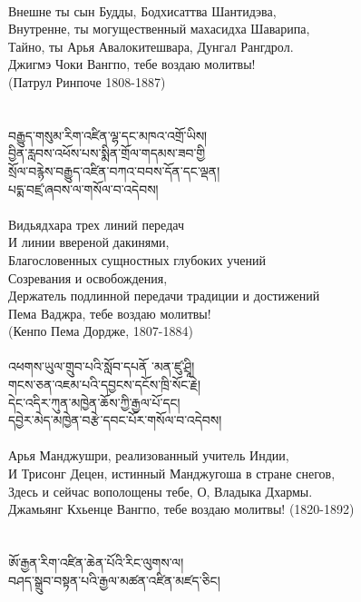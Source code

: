 \\
\ru
Внешне ты сын Будды, Бодхисаттва Шантидэва,\\
Внутренне, ты могущественный махасидха Шаварипа,\\
Тайно, ты Арья Авалокитешвара, Дунгал Рангдрол.\\
Джигмэ Чоки Вангпо, тебе воздаю молитвы!\\
\hspace{1cm} (Патрул Ринпоче 1808-1887)\\
\\
\\
\ti
བརྒྱུད་གསུམ་རིག་འཛིན་ལྷ་དང་མཁའ་འགྲོ་ཡིས། \\
བྱིན་རླབས་འཕོས་པས་སྨིན་གྲོལ་གདམས་ཟབ་གྱི \\
སྲོལ་བརྙེས་བརྒྱུད་འཛིན་བཀའ་བབས་དོན་དང་ལྡན། \\
པདྨ་བཛྲ་ཞབས་ལ་གསོལ་བ་འདེབས།\\
\\
\ru
Видьядхара трех линий передач\\ И линии ввереной дакинями,\\
Благословенных сущностных глубоких учений \\Созревания и освобождения,\\
Держатель подлинной передачи традиции и достижений\\
Пема Ваджра, тебе воздаю молитвы! \\ \hspace{1cm} (Кенпо Пема Дордже, 1807-1884)\\
\\
\newpage
\ti
འཕགས་ཡུལ་གྲུབ་པའི་སློབ་དཔནོ ་མན་ཛུ་ཤྲཱི། \\
གངས་ཅན་འཇམ་པའི་དབྱངས་དངོས་ཁྲི་སོང་རྗེ། \\
དེང་འདིར་ཀུན་མཁྱེན་ཆོས་ཀྱི་རྒྱལ་པོ་དང། \\
དབྱེར་མེད་མཁྱེན་བརྩེ་དབང་པོར་གསོལ་བ་འདེབས།\\
\\
\ru
Арья Манджушри, реализованный учитель Индии,\\
И Трисонг Децен, истинный Манджугоша в стране снегов,\\
Здесь и сейчас вополощены тебе, О, Владыка Дхармы. \\
Джамьянг Кхьенце Вангпо, тебе воздаю молитвы! (1820-1892)\\
\\
\\
\ti
ཨོ་རྒྱན་རིག་འཛིན་ཆེན་པོའི་རིང་ལུགས་ལ། \\
བཤད་སྒྲུབ་བསྟན་པའི་རྒྱལ་མཚན་འཛིན་མཛད་ཅིང།\\
